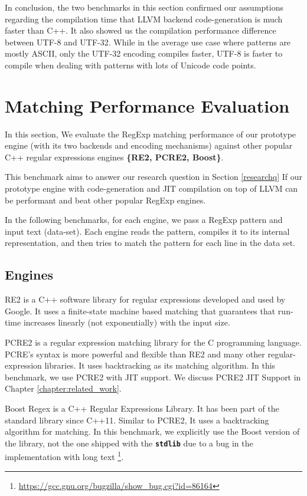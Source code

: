 In conclusion, the two benchmarks in this section confirmed our assumptions regarding the compilation time that LLVM backend code-generation is much faster than C++. It also showed us the compilation performance difference between UTF-8 and UTF-32. While in the average use case where patterns are mostly ASCII, only the UTF-32 encoding compiles faster, UTF-8 is faster to compile when dealing with patterns with lots of Unicode code points.

\section{Matching Performance Evaluation}

In this section, We evaluate the RegExp matching performance of our prototype engine (with its two backends and encoding mechanisms) against other popular C++ regular expressions engines \textbf{\{RE2, PCRE2, Boost\}}.

This benchmark aims to answer our research question in Section \ref{researchq} If our prototype engine with code-generation and JIT compilation on top of LLVM can be performant and beat other popular RegExp engines.

In the following benchmarks, for each engine, we pass a RegExp pattern and input text (data-set). Each engine reads the pattern, compiles it to its internal representation, and then tries to match the pattern for each line in the data set.

\subsection{Engines}
RE2 \cite{re2} is a C++ software library for regular expressions developed and used by Google. It uses a finite-state machine based matching that guarantees that run-time increases linearly (not exponentially) with the input size.

PCRE2 \cite{pcre2} is a regular expression matching library for the C programming language. PCRE's syntax is more powerful and flexible than RE2 and many other regular-expression libraries. It uses backtracking as its matching algorithm. In this benchmark, we use PCRE2 with JIT support. We discuss PCRE2 JIT Support in Chapter \ref{chapter:related_work}.

Boost Regex \cite{Boost} is a C++ Regular Expressions Library. It has been part of the standard library since C++11. Similar to PCRE2, It uses a backtracking algorithm for matching. In this benchmark, we explicitly use the Boost version of the library, not the one shipped with the \texttt{\textbf{stdlib}} due to a bug in the implementation with long text \footnote{\url{https://gcc.gnu.org/bugzilla/show\_bug.cgi?id=86164}}.

